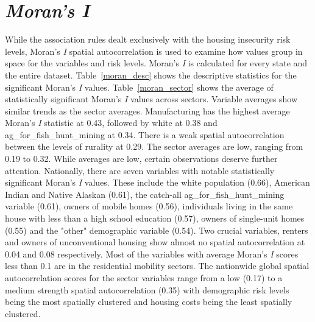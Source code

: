 \section{\textit{Moran's I}}

While the association rules dealt exclusively with the housing insecurity risk levels, Moran’s \textit{I} spatial autocorrelation is used to examine how values group in space for the variables and risk levels. Moran’s \textit{I} is calculated for every state and the entire dataset. Table~\ref{moran_desc} shows the descriptive statistics for the significant Moran's \textit{I} values. Table~\ref{moran_sector} shows the average of statistically significant Moran's \textit{I} values across sectors. Variable averages show similar trends as the sector averages. Manufacturing has the highest average Moran's \textit{I} statistic at 0.43, followed by white at 0.38 and ag\_for\_fish\_hunt\_mining at 0.34. There is a weak spatial autocorrelation between the levels of rurality at 0.29. The sector averages are low, ranging from 0.19 to 0.32. While averages are low, certain observations deserve further attention. Nationally, there are seven variables with notable statistically significant Moran's \textit{I} values. These include the white population (0.66), American Indian and Native Alaskan (0.61), the catch-all ag\_for\_fish\_hunt\_mining variable (0.61), owners of mobile homes (0.56), individuals living in the same house with less than a high school education (0.57), owners of single-unit homes (0.55) and the "other" demographic variable (0.54). Two crucial variables, renters and owners of unconventional housing show almost no spatial autocorrelation at 0.04 and 0.08 respectively. Most of the variables with average Moran's \textit{I} scores less than 0.1 are in the residential mobility sectors. The nationwide global spatial autocorrelation scores for the sector variables range from a low (0.17) to a medium strength spatial autocorrelation (0.35) with demographic risk levels being the most spatially clustered and housing costs being the least spatially clustered.






%

